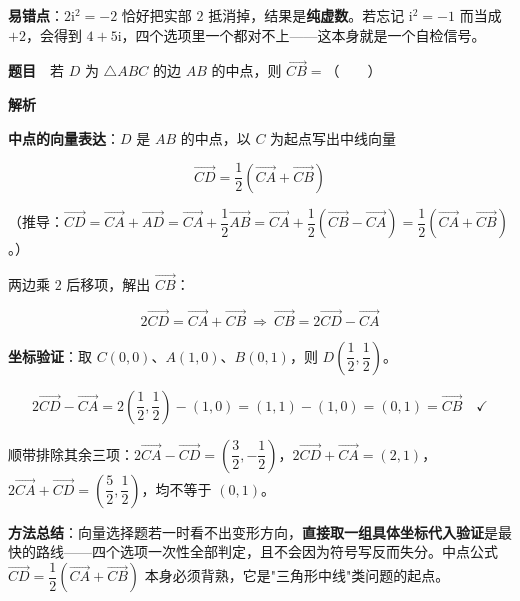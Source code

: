 \begin{gktip}
\textbf{易错点}：$2\mathrm i^{2}=-2$ 恰好把实部 $2$ 抵消掉，结果是\textbf{纯虚数}。若忘记 $\mathrm i^{2}=-1$ 而当成 $+2$，会得到 $4+5\mathrm i$，四个选项里一个都对不上——这本身就是一个自检信号。
\end{gktip}

\par\medskip


\textbf{题目}　若 $D$ 为 $\triangle ABC$ 的边 $AB$ 的中点，则 $\overrightarrow{CB}=$（　　）

\textbf{解析}

\textbf{中点的向量表达}：$D$ 是 $AB$ 的中点，以 $C$ 为起点写出中线向量

\[\overrightarrow{CD}=\frac12\left(\overrightarrow{CA}+\overrightarrow{CB}\right)\]

（推导：$\overrightarrow{CD}=\overrightarrow{CA}+\overrightarrow{AD}=\overrightarrow{CA}+\dfrac12\overrightarrow{AB}=\overrightarrow{CA}+\dfrac12\left(\overrightarrow{CB}-\overrightarrow{CA}\right)=\dfrac12\left(\overrightarrow{CA}+\overrightarrow{CB}\right)$。）

两边乘 $2$ 后移项，解出 $\overrightarrow{CB}$：

\[2\overrightarrow{CD}=\overrightarrow{CA}+\overrightarrow{CB}\ \Longrightarrow\ \overrightarrow{CB}=2\overrightarrow{CD}-\overrightarrow{CA}\]

\textbf{坐标验证}：取 $C(0,0)$、$A(1,0)$、$B(0,1)$，则 $D\left(\dfrac12,\dfrac12\right)$。

\[2\overrightarrow{CD}-\overrightarrow{CA}=2\left(\frac12,\frac12\right)-(1,0)=(1,1)-(1,0)=(0,1)=\overrightarrow{CB}\quad\checkmark\]

顺带排除其余三项：$2\overrightarrow{CA}-\overrightarrow{CD}=\left(\dfrac32,-\dfrac12\right)$，$2\overrightarrow{CD}+\overrightarrow{CA}=(2,1)$，$2\overrightarrow{CA}+\overrightarrow{CD}=\left(\dfrac52,\dfrac12\right)$，均不等于 $(0,1)$。


\begin{gktip}
\textbf{方法总结}：向量选择题若一时看不出变形方向，\textbf{直接取一组具体坐标代入验证}是最快的路线——四个选项一次性全部判定，且不会因为符号写反而失分。中点公式 $\overrightarrow{CD}=\dfrac12\left(\overrightarrow{CA}+\overrightarrow{CB}\right)$ 本身必须背熟，它是"三角形中线"类问题的起点。
\end{gktip}

\par\medskip

